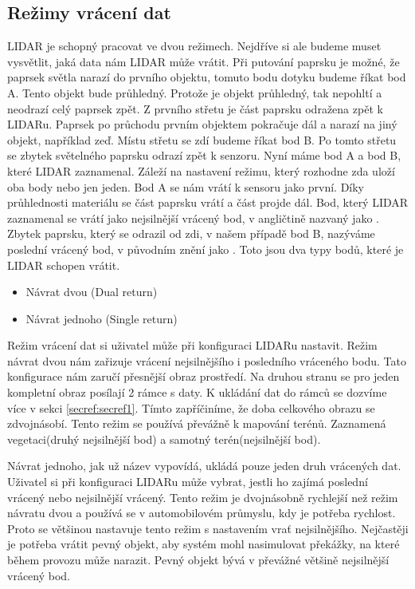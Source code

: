\documentclass[czech,bachelor,dept420,male,cpdeclaration]{diploma}
\begin{document}
\subsection{Režimy vrácení dat}\label{sec:sec2}
LIDAR je schopný pracovat ve dvou režimech. Nejdříve si ale budeme muset vysvětlit, jaká data nám LIDAR může vrátit. Při putování paprsku je možné, že paprsek světla narazí do prvního objektu, tomuto bodu dotyku budeme říkat bod A. Tento objekt bude průhledný. Protože je objekt průhledný, tak nepohltí a neodrazí celý paprsek zpět. Z prvního střetu je část paprsku odražena zpět k LIDARu. Paprsek po průchodu prvním objektem pokračuje dál a narazí na jiný objekt, například zeď. Místu střetu se zdí budeme říkat bod B. Po tomto střetu se zbytek světelného paprsku odrazí zpět k senzoru. Nyní máme bod A a bod B, které LIDAR zaznamenal. Záleží na nastavení režimu, který rozhodne zda uloží oba body nebo jen jeden. Bod A se nám vrátí k sensoru jako první. Díky průhlednosti materiálu se část paprsku vrátí a část projde dál. Bod, který LIDAR zaznamenal se vrátí jako nejsilnější vrácený bod, v angličtině nazvaný jako . Zbytek paprsku, který se odrazil od zdi, v našem případě bod B, nazýváme poslední vrácený bod, v původním znění jako . Toto jsou dva typy bodů, které je LIDAR schopen vrátit.  

	\begin{itemize}
		\item Návrat dvou (Dual return)
		\item Návrat jednoho (Single return)
	\end{itemize}
	
Režim vrácení dat si uživatel může při konfiguraci LIDARu nastavit. Režim návrat dvou nám zařizuje vrácení nejsilnějšího  i posledního vráceného bodu. Tato konfigurace nám zaručí přesnější obraz prostředí. Na druhou stranu se pro jeden kompletní obraz posílají \num{2} rámce s daty. K ukládání dat do rámců se dozvíme více v sekci \ref{secref:secref1}. Tímto zapříčiníme, že doba celkového obrazu se zdvojnásobí. Tento režim se používá převážně k mapování terénů. Zaznamená vegetaci(druhý nejsilnější bod) a samotný terén(nejsilnější bod).

Návrat jednoho, jak už název vypovídá, ukládá pouze jeden druh vrácených dat. Uživatel si při konfiguraci LIDARu může vybrat, jestli ho zajímá poslední vrácený nebo nejsilnější vrácený. Tento režim je dvojnásobně rychlejší než režim návratu dvou a používá se v automobilovém průmyslu, kdy je potřeba rychlost. Proto se většinou nastavuje tento režim s nastavením vrať nejsilnějšího. Nejčastěji je potřeba vrátit pevný objekt, aby systém mohl nasimulovat překážky, na které během provozu může narazit. Pevný objekt bývá v převážné většině nejsilnější vrácený bod. 
\end{document}
